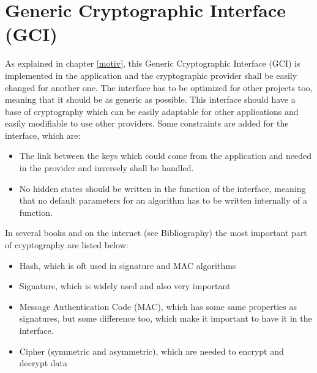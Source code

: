 ﻿\chapter{Generic Cryptographic Interface (GCI)}
As explained in chapter \ref{motiv}, this Generic Cryptographic Interface (GCI)
is implemented in the application and the cryptographic provider shall be easily
changed for another one.
The interface has to be optimized for other projects
too, meaning that it should be as generic as possible. This
interface should have a base of cryptography which can be easily adaptable for
other applications and easily modifiable to use other providers.\newline
Some constraints are added for the interface, which are:
\begin{itemize}
  \item The link between the keys which could come from the application
  and needed in the provider and inversely shall be handled.
  \item No hidden states should be written in the function of the interface,
  meaning that no default parameters for an algorithm has to be written
  internally of a function.\newline
\end{itemize}
In several books and on the internet (see Bibliography) the most
important part of cryptography are listed below:
\begin{itemize}
  \item Hash, which is oft used in signature and MAC algorithms
  \item Signature, which is widely used and also very important
  \item Message Authentication Code (MAC), which has some same properties as
  signatures, but some difference too, which make it important to have it in the
  interface.
  \item Cipher (symmetric and asymmetric), which are needed to encrypt and
  decrypt data
\end{itemize}



